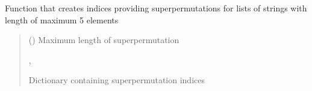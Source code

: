\documentclass[letterpaper,10pt,english]{sphinxmanual}
\begin{document}
\begin{fulllineitems}
\label{\detokenize{geo_utilities:geo_utilities.get_super_permut_dict}}
\pysigstartsignatures
{}
\pysigstopsignatures
\sphinxAtStartPar
Function that creates indices providing superpermutations for lists of strings with length of maximum 5 elements
\begin{quote}\begin{description}
\sphinxAtStartPar
{} () \textendash{} Maximum length of superpermutation

\sphinxAtStartPar
\sphinxcode{\sphinxupquote{Dict}}{[}, \sphinxcode{\sphinxupquote{List}}{[}\sphinxcode{\sphinxupquote{int}}{]}{]}

\sphinxAtStartPar
Dictionary containing superpermutation indices

\end{description}\end{quote}

\end{fulllineitems}

\end{document}
